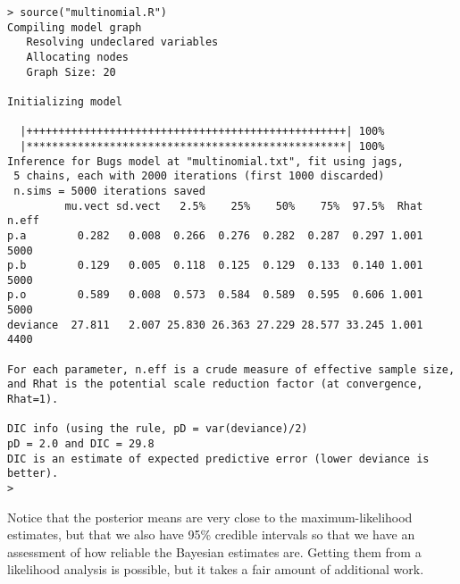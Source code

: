 \documentclass[12pt]{article}
\begin{document}
\begin{verbatim}
> source("multinomial.R")
Compiling model graph
   Resolving undeclared variables
   Allocating nodes
   Graph Size: 20

Initializing model

  |++++++++++++++++++++++++++++++++++++++++++++++++++| 100%
  |**************************************************| 100%
Inference for Bugs model at "multinomial.txt", fit using jags,
 5 chains, each with 2000 iterations (first 1000 discarded)
 n.sims = 5000 iterations saved
         mu.vect sd.vect   2.5%    25%    50%    75%  97.5%  Rhat n.eff
p.a        0.282   0.008  0.266  0.276  0.282  0.287  0.297 1.001  5000
p.b        0.129   0.005  0.118  0.125  0.129  0.133  0.140 1.001  5000
p.o        0.589   0.008  0.573  0.584  0.589  0.595  0.606 1.001  5000
deviance  27.811   2.007 25.830 26.363 27.229 28.577 33.245 1.001  4400

For each parameter, n.eff is a crude measure of effective sample size,
and Rhat is the potential scale reduction factor (at convergence, Rhat=1).

DIC info (using the rule, pD = var(deviance)/2)
pD = 2.0 and DIC = 29.8
DIC is an estimate of expected predictive error (lower deviance is better).
>
\end{verbatim}
Notice that the posterior means are very close to the
maximum-likelihood estimates, but that we also have 95\% credible
intervals so that we have an assessment of how reliable the Bayesian
estimates are. Getting them from a likelihood analysis is possible,
but it takes a fair amount of additional work.




\ccLicense
\end{document}
